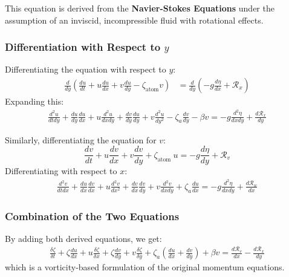     This equation is derived from the \textbf{Navier-Stokes Equations} under the assumption of an inviscid, incompressible fluid with rotational effects.

    \subsubsection*{Differentiation with Respect to $y$}
    Differentiating the equation with respect to $y$:
    \begin{align}
        \frac{d}{dy} \left( \frac{d u}{d t} + u \frac{d u}{d x} + v \frac{d u}{d y} - \zeta_\text{atom} v \right) &= \frac{d}{dy} \left( - g \frac{d \eta}{d x} + \mathcal{R}_x \right)
    \end{align}
    Expanding this:
    \begin{align}
        \frac{d^2 u}{d t d y}+\frac{d u}{d y} \frac{d u}{d x}+u \frac{d^2 u}{d x d y}+\frac{d v}{d y} \frac{d u}{d y}+v \frac{d^2 u}{d y^2}-\zeta_a \frac{d v}{d y}-\beta v=-g \frac{d^2 \eta}{d x d y}+\frac{d \mathcal{R}_x}{d y}
    \end{align}

    Similarly, differentiating the equation for $v$:
    \begin{equation*}
        \frac{d v}{d t}+u \frac{d v}{d x}+v \frac{d v}{d y}+\zeta_{\text {atom }} u=-g \frac{d \eta}{d y}+\mathcal{R}_v
    \end{equation*}
    Differentiating with respect to $x$:
    \begin{align}
        \frac{d^2 v}{d t d x}+\frac{d u}{d x} \frac{d v}{d x}+u \frac{d^2 v}{d x^2}+\frac{d v}{d x} \frac{d v}{d y}+v \frac{d^2 v}{d x d y}+\zeta_a \frac{d u}{d x}=-g \frac{d^2 \eta}{d x d y}+\frac{d \mathcal{R}_w}{d x}
    \end{align}

    \subsubsection*{Combination of the Two Equations}
    By adding both derived equations, we get:
    \begin{align}
        \frac{\delta \zeta}{\delta t}+\zeta \frac{d u}{d x}+u \frac{\delta \zeta}{\delta x}+\zeta \frac{d v}{d y}+v \frac{\delta \zeta}{\delta y}+\zeta_a\left(\frac{d u}{d x}+\frac{d v}{d y}\right)+\beta v=\frac{d \mathcal{R}_v}{d x}-\frac{d \mathcal{R}_x}{d y}
    \end{align}
    which is a vorticity-based formulation of the original momentum equations.

